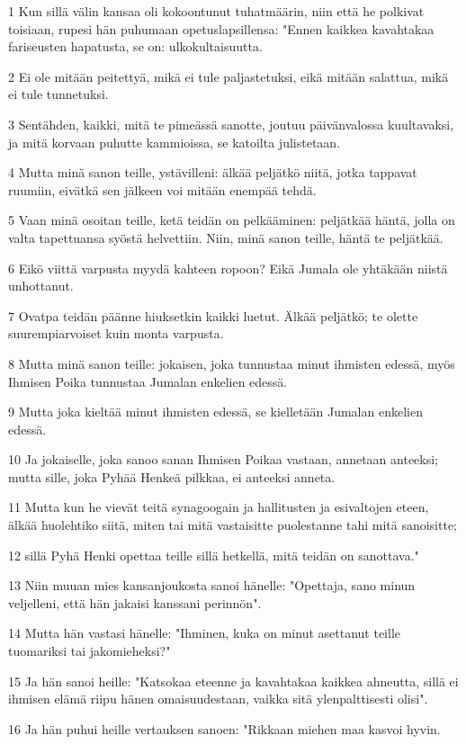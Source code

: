\par 1 Kun sillä välin kansaa oli kokoontunut tuhatmäärin, niin että he polkivat toisiaan, rupesi hän puhumaan opetuslapsillensa: "Ennen kaikkea kavahtakaa fariseusten hapatusta, se on: ulkokultaisuutta.
\par 2 Ei ole mitään peitettyä, mikä ei tule paljastetuksi, eikä mitään salattua, mikä ei tule tunnetuksi.
\par 3 Sentähden, kaikki, mitä te pimeässä sanotte, joutuu päivänvalossa kuultavaksi, ja mitä korvaan puhutte kammioissa, se katoilta julistetaan.
\par 4 Mutta minä sanon teille, ystävilleni: älkää peljätkö niitä, jotka tappavat ruumiin, eivätkä sen jälkeen voi mitään enempää tehdä.
\par 5 Vaan minä osoitan teille, ketä teidän on pelkääminen: peljätkää häntä, jolla on valta tapettuansa syöstä helvettiin. Niin, minä sanon teille, häntä te peljätkää.
\par 6 Eikö viittä varpusta myydä kahteen ropoon? Eikä Jumala ole yhtäkään niistä unhottanut.
\par 7 Ovatpa teidän päänne hiuksetkin kaikki luetut. Älkää peljätkö; te olette suurempiarvoiset kuin monta varpusta.
\par 8 Mutta minä sanon teille: jokaisen, joka tunnustaa minut ihmisten edessä, myös Ihmisen Poika tunnustaa Jumalan enkelien edessä.
\par 9 Mutta joka kieltää minut ihmisten edessä, se kielletään Jumalan enkelien edessä.
\par 10 Ja jokaiselle, joka sanoo sanan Ihmisen Poikaa vastaan, annetaan anteeksi; mutta sille, joka Pyhää Henkeä pilkkaa, ei anteeksi anneta.
\par 11 Mutta kun he vievät teitä synagoogain ja hallitusten ja esivaltojen eteen, älkää huolehtiko siitä, miten tai mitä vastaisitte puolestanne tahi mitä sanoisitte;
\par 12 sillä Pyhä Henki opettaa teille sillä hetkellä, mitä teidän on sanottava."
\par 13 Niin muuan mies kansanjoukosta sanoi hänelle: "Opettaja, sano minun veljelleni, että hän jakaisi kanssani perinnön".
\par 14 Mutta hän vastasi hänelle: "Ihminen, kuka on minut asettanut teille tuomariksi tai jakomieheksi?"
\par 15 Ja hän sanoi heille: "Katsokaa eteenne ja kavahtakaa kaikkea ahneutta, sillä ei ihmisen elämä riipu hänen omaisuudestaan, vaikka sitä ylenpalttisesti olisi".
\par 16 Ja hän puhui heille vertauksen sanoen: "Rikkaan miehen maa kasvoi hyvin.
